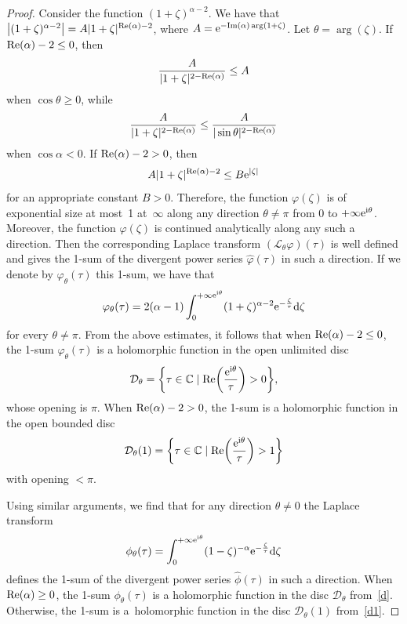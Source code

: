 \documentclass[10pt,a4paper]{amsart}
\numberwithin{equation}{section}
\begin{document}
\begin{proof}
 Consider the function $(1+\zeta)^{\alpha-2}$. We have that $\bigl|(1+\zeta)^{\alpha-2}\bigr|=A |1+\zeta|^{{\rm Re}(\alpha) -2}$, where
 $A={\rm e}^{-{\rm Im} (\alpha) \arg (1+\zeta)}$. Let $\theta=\arg (\zeta)$. If ${\rm Re} (\alpha) -2 \leq 0$, then
 \[
 \frac{A}{|1+\zeta|^{2 - {\rm Re}(\alpha)}} \leq A
 \]
 when $\cos \theta \geq 0$, while
 \[
 \frac{A}{|1+\zeta|^{2 - {\rm Re}(\alpha)}} \leq \frac{A}{|\sin \theta|^{2 - {\rm Re}(\alpha)}}
 \]
 when $\cos \alpha < 0$. If ${\rm Re} (\alpha) - 2 >0$, then
 \[
 A |1+\zeta|^{{\rm Re}(\alpha) -2} \leq B {\rm e}^{|\zeta|}
 \]
 for an appropriate constant $B > 0$. Therefore, the function $\varphi(\zeta)$ is of exponential size at most~1 at~$\infty$
 along any direction $\theta \neq \pi$ from $0$ to $+\infty {\rm e}^{{\rm i} \theta}$. Moreover, the function $\varphi(\zeta)$ is
 continued analytically along any such a direction. Then the corresponding Laplace transform $(\mathcal{L}_{\theta} \varphi)(\tau)$
 is well defined and gives the 1-sum of the divergent power series $\hat{\varphi}(\tau)$ in such a direction. If we denote
 by $\varphi_{\theta}(\tau)$ this 1-sum, we have that
 \[
 \varphi_{\theta}(\tau)=2 (\alpha-1)
 \int_0^{+\infty {\rm e}^{{\rm i} \theta}}
 (1+\zeta)^{\alpha-2} {\rm e}^{-\frac{\zeta}{\tau}} {\rm d} \zeta
 \]
 for every $\theta \neq \pi$. From the above estimates, it follows that when ${\rm Re} (\alpha) -2 \leq 0$, the 1-sum
 $\varphi_{\theta}(\tau)$ is a holomorphic function in the open unlimited disc
 \begin{equation}
 \mathcal{D}_{\theta}=\biggl\{ \tau\in\mathbb{C} \mid {\rm Re} \biggl(\frac{{\rm e}^{{\rm i} \theta}}{\tau}\biggr) > 0 \biggr\} ,\label{d}
 \end{equation}
 whose opening is $\pi$.
 When ${\rm Re} (\alpha) - 2 > 0$, the 1-sum is a holomorphic function in the open bounded disc
 \begin{equation}
 \mathcal{D}_{\theta}(1)=\biggl\{ \tau\in\mathbb{C} \mid {\rm Re} \biggl(\frac{{\rm e}^{{\rm i} \theta}}{\tau}\biggr) > 1 \biggr\}\label{d1}
 \end{equation}
 with opening $ < \pi$.

 Using similar arguments, we find that for any direction $\theta \neq 0$ the Laplace transform
 \[
 \phi_{\theta}(\tau)=\int_0^{+\infty {\rm e}^{{\rm i} \theta}}
 (1-\zeta)^{-\alpha} {\rm e}^{-\frac{\zeta}{\tau}} {\rm d} \zeta
 \]
 defines the 1-sum of the divergent power series $\hat{\phi}(\tau)$ in such a direction. When ${\rm Re} (\alpha) \geq 0$,
 the 1-sum $\phi_{\theta}(\tau)$ is a holomorphic function in the disc $\mathcal{D}_{\theta}$ from~\eqref{d}. Otherwise, the
 1-sum is a~holomorphic function in the disc $\mathcal{D}_{\theta}(1)$ from~\eqref{d1}.
 \end{proof}
\end{document}
